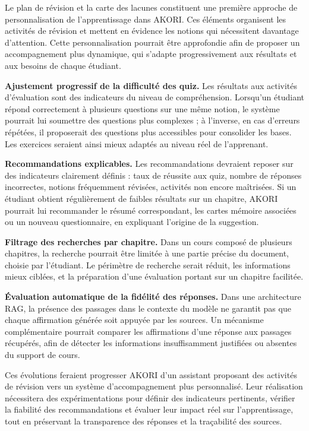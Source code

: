\documentclass[12pt,a4paper,oneside]{report}
\begin{document}
Le plan de révision et la carte des lacunes constituent une première approche de personnalisation de l'apprentissage dans AKORI. Ces éléments organisent les activités de révision et mettent en évidence les notions qui nécessitent davantage d'attention. Cette personnalisation pourrait être approfondie afin de proposer un accompagnement plus dynamique, qui s'adapte progressivement aux résultats et aux besoins de chaque étudiant.

\textbf{Ajustement progressif de la difficulté des quiz.} Les résultats aux activités d'évaluation sont des indicateurs du niveau de compréhension. Lorsqu'un étudiant répond correctement à plusieurs questions sur une même notion, le système pourrait lui soumettre des questions plus complexes ; à l'inverse, en cas d'erreurs répétées, il proposerait des questions plus accessibles pour consolider les bases. Les exercices seraient ainsi mieux adaptés au niveau réel de l'apprenant.

\textbf{Recommandations explicables.} Les recommandations devraient reposer sur des indicateurs clairement définis : taux de réussite aux quiz, nombre de réponses incorrectes, notions fréquemment révisées, activités non encore maîtrisées. Si un étudiant obtient régulièrement de faibles résultats sur un chapitre, AKORI pourrait lui recommander le résumé correspondant, les cartes mémoire associées ou un nouveau questionnaire, en expliquant l'origine de la suggestion.

\textbf{Filtrage des recherches par chapitre.} Dans un cours composé de plusieurs chapitres, la recherche pourrait être limitée à une partie précise du document, choisie par l'étudiant. Le périmètre de recherche serait réduit, les informations mieux ciblées, et la préparation d'une évaluation portant sur un chapitre facilitée.

\textbf{Évaluation automatique de la fidélité des réponses.} Dans une architecture RAG, la présence des passages dans le contexte du modèle ne garantit pas que chaque affirmation générée soit appuyée par les sources. Un mécanisme complémentaire pourrait comparer les affirmations d'une réponse aux passages récupérés, afin de détecter les informations insuffisamment justifiées ou absentes du support de cours.

Ces évolutions feraient progresser AKORI d'un assistant proposant des activités de révision vers un système d'accompagnement plus personnalisé. Leur réalisation nécessitera des expérimentations pour définir des indicateurs pertinents, vérifier la fiabilité des recommandations et évaluer leur impact réel sur l'apprentissage, tout en préservant la transparence des réponses et la traçabilité des sources.
\end{document}
